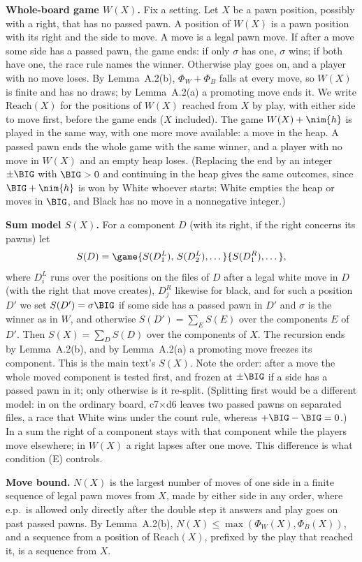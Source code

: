 \textbf{Whole-board game $W(X)$.} Fix a setting. Let $X$ be a pawn position, possibly with a right, that has no passed
pawn. A position of $W(X)$ is a pawn position with its right and the side to move. A move is a legal pawn move. If after a
move some side has a passed pawn, the game ends: if only $\sigma$ has one, $\sigma$ wins; if both have one, the race rule
names the winner. Otherwise play goes on, and a player with no move loses. By Lemma~A.2(b), $\Phi_W+\Phi_B$ falls at every
move, so $W(X)$ is finite and has no draws; by Lemma~A.2(a) a promoting move ends it. We write $\mathrm{Reach}(X)$ for the
positions of $W(X)$ reached from $X$ by play, with either side to move first, before the game ends ($X$ included). The
game $W(X)+\nim{h}$ is played in the same way, with one more move available: a move in the heap. A passed pawn ends the whole
game with the same winner, and a player with no move in $W(X)$ and an empty heap loses. (Replacing the end by an integer
$\pm\BIG$ with $\BIG>0$ and continuing in the heap gives the same outcomes, since $\BIG+\nim{h}$ is won by White whoever
starts: White empties the heap or moves in $\BIG$, and Black has no move in a nonnegative integer.)

\textbf{Sum model $S(X)$.} For a component $D$ (with its right, if the right concerns its pawns) let
\[
S(D)=\game{S(D^L_1),\,S(D^L_2),\dots}{S(D^R_1),\dots},
\]
where $D^L_i$ runs over the positions on the files of $D$ after a legal white move in $D$ (with the right that move
creates), $D^R_j$ likewise for black, and for such a position $D'$ we set $S(D')=\sigma\BIG$ if some side has a passed pawn
in $D'$ and $\sigma$ is the winner as in $W$, and otherwise $S(D')=\sum_E S(E)$ over the components $E$ of $D'$. Then
$S(X)=\sum_D S(D)$ over the components of $X$. The recursion ends by Lemma~A.2(b), and by Lemma~A.2(a) a promoting move
freezes its component. This is the main text's $S(X)$. Note the order: after a move the whole moved component is tested first, and
frozen at $\pm\BIG$ if a side has a passed pawn in it; only otherwise is it re-split. (Splitting first would be a different model: in  on the ordinary board, c7$\times$d6 leaves two passed pawns on separated files, a race that White wins under the count rule, whereas $+\BIG-\BIG=0$.) In a sum the right of a component
stays with that component while the players move elsewhere; in $W(X)$ a right lapses after one move. This difference is
what condition (E) controls.

\textbf{Move bound.} $N(X)$ is the largest number of moves of one side in a finite sequence of legal pawn moves from $X$,
made by either side in any order, where e.p.\ is allowed only directly after the double step it answers and play goes on
past passed pawns. By Lemma~A.2(b), $N(X)\le\max(\Phi_W(X),\Phi_B(X))$, and a sequence from a position of
$\mathrm{Reach}(X)$, prefixed by the play that reached it, is a sequence from $X$.

